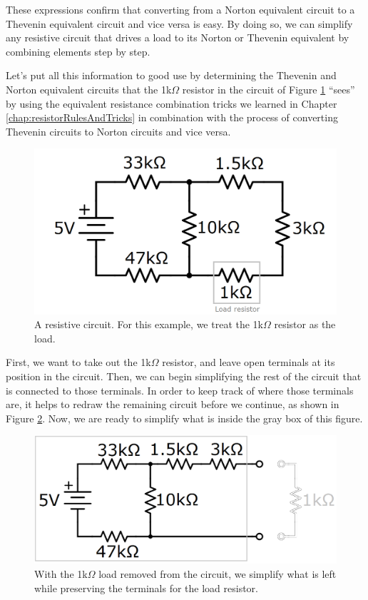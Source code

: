 These expressions confirm that converting from a Norton equivalent circuit to a Thevenin equivalent circuit and vice versa is easy. By doing so, we can simplify any resistive circuit that drives a load to its Norton or Thevenin equivalent by combining elements step by step.
\par
Let's put all this information to good use by determining the Thevenin and Norton equivalent circuits that the 1k$\Omega$ resistor in the circuit of Figure \ref{NortonTheveninEx1} ``sees'' by using the equivalent resistance combination tricks we learned in Chapter \ref{chap:resistorRulesAndTricks} in combination with the process of converting Thevenin circuits to Norton circuits and vice versa.
\begin{figure}[h!]
\centering
\includegraphics[width=15cm]{figures/nortThevEx_1.png}
\caption{A resistive circuit. For this example, we treat the 1k$\Omega$ resistor as the load.}
\label{NortonTheveninEx1}
\end{figure}
First, we want to take out the 1k$\Omega$ resistor, and leave open terminals at its position in the circuit. Then, we can begin simplifying the rest of the circuit that is connected to those terminals. In order to keep track of where those terminals are, it helps to redraw the remaining circuit before we continue, as shown in Figure \ref{NortonTheveninEx2}. Now, we are ready to simplify what is inside the gray box of this figure. 
\begin{figure}[h!]
\centering
\includegraphics[width=15cm]{figures/nortThevEx_2.png}
\caption{With the 1k$\Omega$ load removed from the circuit, we simplify what is left while preserving the terminals for the load resistor.}
\label{NortonTheveninEx2}
\end{figure}
